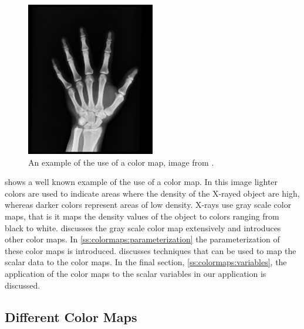 
\begin{figure}
	\centering
	\includegraphics[width=0.5\textwidth, height=0.2\textheight, keepaspectratio]{colormapping/img/x-ray.jpg}
	\caption{An example of the use of a color map, image from \cite{xray}.}
	\label{fig:colormapping:xray}
\end{figure}

 shows a well known example of the use of a color map. In this image lighter colors are used to indicate areas where the density of the X-rayed object are high, whereas darker colors represent areas of low density. X-rays use gray scale color maps, that is it maps the density values of the object to colors ranging from black to white.  discusses the gray scale color map extensively and introduces other color maps. In \cref{ss:colormaps:parameterization} the parameterization of these color maps is introduced.  discusses techniques that can be used to map the scalar data to the color maps. In the final section, \cref{ss:colormaps:variables}, the application of the color maps to the scalar variables in our application is discussed. 

\subsection{Different Color Maps}
\label{ss:colormaps:differentmaps}

